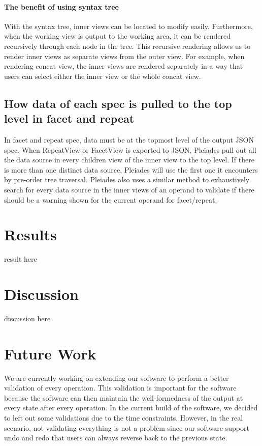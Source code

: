 \documentclass[journal]{vgtc}                %
\begin{document}
\paragraph{The benefit of using syntax tree} With the syntax tree, inner views
can be located to modify easily. Furthermore, when the working view is output to
the working area, it can be rendered recursively through each node in the tree.
This recursive rendering allows us to render inner views as separate views from
the outer view. For example, when rendering concat view, the inner views are
rendered separately in a way that users can select either the inner view or
the whole concat view.

\subsection{How data of each spec is pulled to the top level in facet and repeat}
In facet and repeat spec, data must be at the topmost level of the output JSON
spec. When RepeatView or FacetView is exported to JSON, Pleiades pull out all
the data source in every children view of the inner view to the top level. If
there is more than one distinct data source, Pleiades will use the first one it
encounters by pre-order tree traversal. Pleiades also uses a similar method to
exhaustively search for every data source in the inner views of an operand to
validate if there should be a warning shown for the current operand for facet/repeat.

\section{Results}

result here

\section{Discussion}

discussion here

\section{Future Work}
We are currently working on extending our software to perform a better validation
of every operation. This validation is important for the software because the
software can then maintain the well-formedness of the output at every state after
every operation. In the current build of the software, we decided to left out some
validations due to the time constraints. However, in the real scenario, not validating
everything is not a problem since our software support undo and redo that users
can always reverse back to the previous state.
\end{document}
